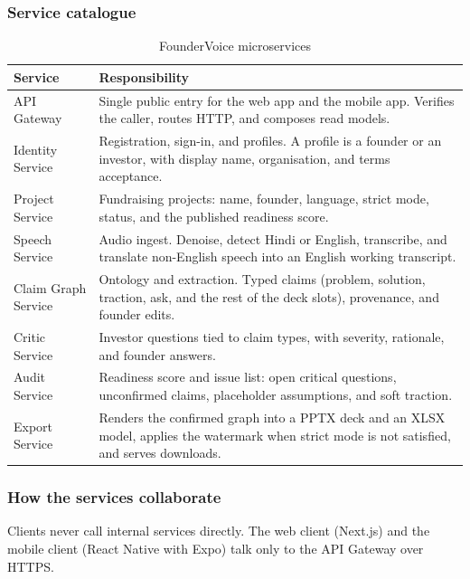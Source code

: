 \documentclass[11pt,a4paper]{article}
\begin{document}
\subsubsection{Service catalogue}

\begin{table}[ht]
\centering
\caption{FounderVoice microservices}
\label{tab:services}
\small
\begin{tabularx}{\textwidth}{@{}l X@{}}
\toprule
\textbf{Service} & \textbf{Responsibility} \\
\midrule
API Gateway &
Single public entry for the web app and the mobile app. Verifies the caller, routes HTTP, and composes read models. \\
Identity Service &
Registration, sign-in, and profiles. A profile is a founder or an investor, with display name, organisation, and terms acceptance. \\
Project Service &
Fundraising projects: name, founder, language, strict mode, status, and the published readiness score. \\
Speech Service &
Audio ingest. Denoise, detect Hindi or English, transcribe, and translate non-English speech into an English working transcript. \\
Claim Graph Service &
Ontology and extraction. Typed claims (problem, solution, traction, ask, and the rest of the deck slots), provenance, and founder edits. \\
Critic Service &
Investor questions tied to claim types, with severity, rationale, and founder answers. \\
Audit Service &
Readiness score and issue list: open critical questions, unconfirmed claims, placeholder assumptions, and soft traction. \\
Export Service &
Renders the confirmed graph into a PPTX deck and an XLSX model, applies the watermark when strict mode is not satisfied, and serves downloads. \\
\bottomrule
\end{tabularx}
\end{table}

\subsubsection{How the services collaborate}

Clients never call internal services directly. The web client (Next.js) and the mobile client (React Native with Expo) talk only to the API Gateway over HTTPS.
\end{document}
